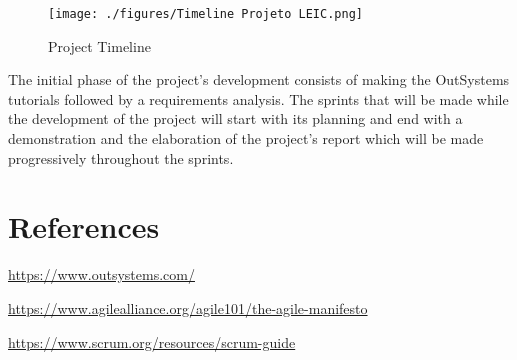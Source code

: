 \documentclass[a4paper,openright,12pt]{report}
\begin{document}
\begin{figure}[H]
  \texttt{[image: ./figures/Timeline Projeto LEIC.png]}
  \caption{Project Timeline}\label{fig:schedule}
\end{figure}

The initial phase of the project's development consists of making the OutSystems tutorials followed by a requirements analysis. 
The sprints that will be made while the development of the project will start with its planning and end with a demonstration 
and the elaboration of the project's report which will be made progressively throughout the sprints.

\section*{References}
\begin{enumerate}[label={[\arabic*]}]
  \item \url{https://www.outsystems.com/}
  \item \url{https://www.agilealliance.org/agile101/the-agile-manifesto}
  \item \url{https://www.scrum.org/resources/scrum-guide}
\end{enumerate}
\end{document}
